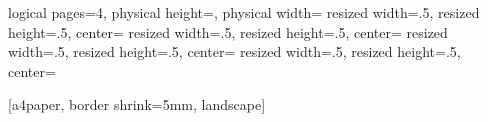 {
{
  \edef\pgfpageoptionheight{\the\paperheight} 
  \edef\pgfpageoptionwidth{\the\paperwidth}
  \edef\pgfpageoptionborder{0pt}
}
{
  \pgfpagesphysicalpageoptions
  {%
    logical pages=4,%
    physical height=\pgfpageoptionheight,%
    physical width=\pgfpageoptionwidth%
  }
  {%
    resized width=.5\pgfphysicalwidth,%
    resized height=.5\pgfphysicalheight,%
    center=\pgfpoint{.25\pgfphysicalwidth}{.75\pgfphysicalheight}%
  }%
  {%
    resized width=.5\pgfphysicalwidth,%
    resized height=.5\pgfphysicalheight,%
    center=\pgfpoint{.75\pgfphysicalwidth}{.75\pgfphysicalheight}%
  }%
  {%
    resized width=.5\pgfphysicalwidth,%
    resized height=.5\pgfphysicalheight,%
    center=\pgfpoint{.25\pgfphysicalwidth}{.25\pgfphysicalheight}%
  }%
  {%
    resized width=.5\pgfphysicalwidth,%
    resized height=.5\pgfphysicalheight,%
    center=\pgfpoint{.75\pgfphysicalwidth}{.25\pgfphysicalheight}%
  }%
}


  [a4paper, border shrink=5mm, landscape]
  \nofiles
}





\newcommand{\hkapitola}[1]{
\section{#1}
\begin{frame}
\begin{block}{}
\Huge
\centering
#1
\end{block}
\end{frame}
}



\newcommand{\kapitola}[1]{
\subsection{#1}
\begin{frame}
\begin{block}{}
\Large
\centering
#1
\end{block}
\end{frame}
}



